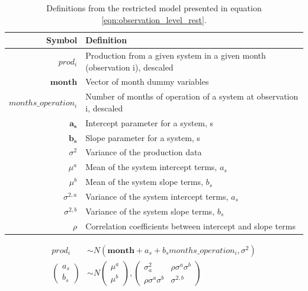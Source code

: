 \documentclass[a4paper]{article}
\begin{document}
\begin{table}
  \begin{tabular}{rl}
  \toprule
    Symbol &  Definition \\
    \midrule
    $prod_i$ & Production from a given system in a given month (observation i), descaled\\
    $\mathbf{month}$ & Vector of month dummy variables\\
    $months\_operation_i$ & Number of months of operation of a system at observation i, descaled \\
    $\mathbf{a_s}$& Intercept parameter for a system, s \\
    $\mathbf{b_s}$ & Slope parameter for a system, s \\
    $\sigma^2$ & Variance of the production data \\
    $\mu^a$ & Mean of the system intercept terms, $a_s$ \\
    $\mu^b$ & Mean of the system slope terms, $b_s$ \\
    $\sigma^{2,a}$ & Variance of the system intercept terms, $a_s$ \\
    $\sigma^{2,b}$ & Variance of the system slope terms, $b_s$ \\
    $\rho$ & Correlation coefficients between intercept and slope terms \\

  \bottomrule
  \end{tabular}
  \caption{Definitions from the restricted model presented in equation \ref{eqn:observation_level_rest}. \label{tbl:definitions3p1}}
\end{table}

\begin{equation}
\begin{aligned}
prod_{i} &\sim N(\mathbf{month} + a_s + b_s months\_operation_{i}, \sigma^2)\\
\begin{pmatrix}
  a_s\\
  b_s
\end{pmatrix}
&\sim N
\begin{pmatrix}
  \mu^a\\
  \mu^b
\end{pmatrix},
\begin{pmatrix}
  \sigma_a^2 & \rho \sigma^a \sigma^b \\
  \rho \sigma^a \sigma^b & \sigma^{2,b}
\end{pmatrix}\label{eqn:observation_level_rest}
\end{aligned}
\end{equation}
\end{document}
